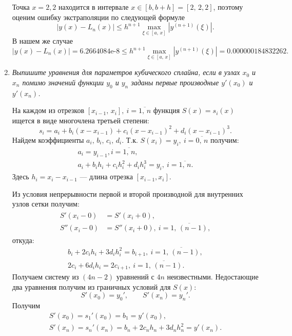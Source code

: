 \documentclass[12pt, a4paper]{article}
\begin{document}
\begin{enumerate}
		Точка $x=2{,}2$ находится в интервале $x \in [b,b+h] = [2,\,2{,}2]$, поэтому оценим ошибку экстраполяции по следующей формуле
		\[
		|y(x)-L_n(x)|\le h^{n+1}\max_{\xi \in [a,\,x]}|y^{(n+1)}(\xi)|.
		\]
		В нашем же случае
		\[
		|y(x)-L_n(x)| = 6.2664084 \text{e-8} \le h^{n+1}\max_{\xi \in [a,\,x]}|y^{(n+1)}(\xi)| = 0.000000184832262.
		\]
		\item \textit{Выпишите уравнения для параметров кубического сплайна, если в узлах $x_0$ и $x_n$ помимо значений функции $y_0$ и $y_n$
			заданы первые производные $y'(x_0)$ и $y'(x_n)$.}
		\smallskip
		
		На каждом из отрезков $ [ x_{i - 1}, \, x_i ], \: i = \overline{1, \, n} $ функция $ S(x) = s_i(x) $ ищется  в виде многочлена третьей степени:
		\[
		s_i = a_i + b_i (x - x_{i - 1}) + c_i (x - x_{i - 1})^2 + d_i (x - x_{i - 1})^3. 
		\]
		Найдем коэффициенты $ a_i, \, b_i, \, c_i, \, d_i $. Т.к. $ S(x_i) = y_i, \: i = \overline{0, \, n} $ получим:			
		\begin{gather*}
			a_i = y_{i - 1}, i = \overline{1, \, n}, \\
			a_i + b_i h_i + c_i h_i^2 + d_i h_i^3 = y_i, \: i = \overline{1, \, n}.
		\end{gather*}
		Здесь $ h_i = x_i - x_{i - 1} $ --- длина отрезка $[x_{i-1},x_i]$. 
		
		Из условия непрерывности первой и второй производной для внутренних узлов сетки получим:
		\begin{gather*}
			\begin{aligned}
				S'(x_i - 0) &= S'(x_i + 0), \\
				S''(x_i - 0) &= S''(x_i + 0), \: i = \overline{1, \, (n - 1)},
			\end{aligned}
		\end{gather*}
		откуда:
		\begin{gather*}
			b_i + 2 c_i h_i + 3 d_i h_i^2 = b_{i + 1}, \: i = \overline{1, \, (n - 1)}, \\
			2 c_i + 6d_i h_i = 2 c_{i + 1}, \: i = \overline{1, \, (n - 1)}.
		\end{gather*}
		Получаем систему из $ (4 n - 2) $ уравнений с $ 4 n $ неизвестными.
		Недостающие два уравнения получим из граничных условий для $S(x)$:
		\[
		S'(x_0) = y_0', \qquad S'(x_n) = y_n'. 
		\]
		Получим
		\begin{gather*}
			S'(x_0) = s_1'(x_0) =  b_1 = y'(x_0), \\
			S'(x_n) = s_n'(x_n) = b_n + 2 c_n h_n + 3 d_n h_n^2 = y'(x_n).
		\end{gather*}
		

\end{enumerate}
\end{document}
